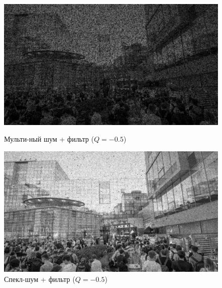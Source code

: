 \documentclass[a4paper]{article}
\begin{document}
\begin{figure}[H]
    \begin{minipage}{0.49\textwidth}
        \centering \includegraphics[width=\textwidth]{images/2_low_filters/multiplicative - contrharmonic (Q=-0.5).jpg}
        \caption{Мульти-ный шум + фильтр ($Q = -0.5$)}
    \end{minipage}\hfill
    \begin{minipage}{0.49\textwidth}
        \centering \includegraphics[width=\textwidth]{images/2_low_filters/speckle - contrharmonic (Q=-0.5).jpg}
        \caption{Спекл-шум + фильтр ($Q = -0.5$)}
    \end{minipage}
\end{figure}
\end{document}
